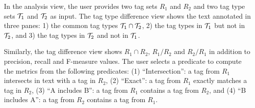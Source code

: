 In the analysis view, the user provides 
two tag sets $R_1$ and $R_2$ and 
two tag type sets ${\cal T}_1$ and ${\cal T}_2$ as input. 
%
The tag type difference view shows the text annotated in three panes: 
1) the common tag types ${\cal T}_1 \cap {\cal T}_2$,
2) the tag types in ${\cal T}_1$ but not in ${\cal T}_2$, 
and 3) the tag types in ${\cal T}_2$ and not in ${\cal T}_1$.

Similarly, the tag difference view shows $R_1\cap R_2$, $R_1/R_2$ and $R_2/R_1$
in addition to precision, recall and F-measure values. 
The user selects a predicate to compute the metrics from the following predicates:
(1) ``Intersection'': a tag from $R_1$ intersects in text with a tag in $R_2$,
(2) ``Exact'': a tag from $R_1$ exactly matches a tag in $R_2$,
(3) ``A includes B'': a tag from $R_1$ contains a tag from $R_2$, and
(4) ``B includes A'': a tag from $R_2$ contains a tag from $R_1$.
